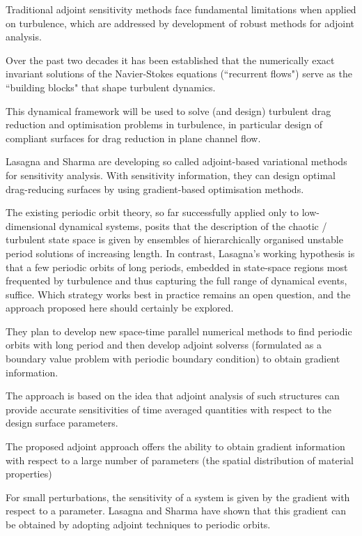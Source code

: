 Traditional adjoint sensitivity methods face fundamental limitations when applied
on turbulence, which are addressed by development of robust methods for adjoint
analysis. %

Over the past two decades it has been established that the
numerically exact invariant solutions of the Navier-Stokes
equations (``recurrent flows") serve as the ``building blocks" that
shape turbulent dynamics.

This dynamical framework  will be used to solve (and design) turbulent drag
reduction and optimisation problems in turbulence, in particular design of
compliant surfaces for drag reduction in plane channel flow.

Lasagna and Sharma are developing so called adjoint-based variational methods for
sensitivity analysis. With sensitivity information, they can design optimal
drag-reducing surfaces by using gradient-based optimisation methods.

The existing periodic orbit theory, so far successfully applied
only to low-dimensional dynamical systems, posits that the
description of the chaotic / turbulent state space is given by
ensembles of hierarchically organised unstable period solutions of
increasing length.
In contrast, Lasagna's working hypothesis is that a few periodic orbits of long
periods, embedded in state-space regions most frequented by turbulence and thus
capturing the full range of dynamical events, suffice. Which strategy works best
in practice remains an open question, and the approach proposed here should
certainly be explored.

They plan to develop new space-time parallel numerical methods to
find periodic orbits with long period and then develop adjoint
solverss
(formulated as a boundary value problem with periodic boundary condition)
to obtain gradient information.

The approach is based on the idea that adjoint analysis of such
structures can provide accurate sensitivities of time averaged
quantities with respect to the design surface parameters.


The proposed adjoint approach offers the ability to obtain
gradient information
with respect to a large number of parameters (the spatial
distribution of material properties)

For small perturbations, the sensitivity of a system is given by
the gradient with respect to a parameter.
Lasagna and Sharma have shown that this gradient can be obtained by
adopting adjoint techniques to periodic orbits.

